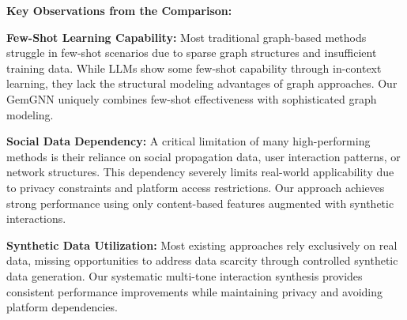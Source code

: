 





\textbf{Key Observations from the Comparison:}

\textbf{Few-Shot Learning Capability:} Most traditional graph-based methods struggle in few-shot scenarios due to sparse graph structures and insufficient training data. While LLMs show some few-shot capability through in-context learning, they lack the structural modeling advantages of graph approaches. Our GemGNN uniquely combines few-shot effectiveness with sophisticated graph modeling.

\textbf{Social Data Dependency:} A critical limitation of many high-performing methods is their reliance on social propagation data, user interaction patterns, or network structures. This dependency severely limits real-world applicability due to privacy constraints and platform access restrictions. Our approach achieves strong performance using only content-based features augmented with synthetic interactions.

\textbf{Synthetic Data Utilization:} Most existing approaches rely exclusively on real data, missing opportunities to address data scarcity through controlled synthetic data generation. Our systematic multi-tone interaction synthesis provides consistent performance improvements while maintaining privacy and avoiding platform dependencies.

